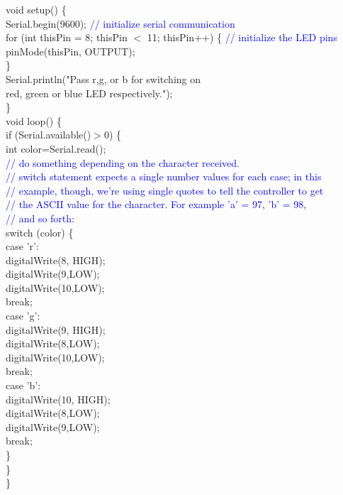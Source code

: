 \documentclass[12pt,a4paper]{article}
\begin{document}
void setup() \{\\
 Serial.begin(9600); \textcolor{blue}{ // initialize serial communication}\\
 for (int thisPin = 8; thisPin $<$ 11; thisPin++) \{    \textcolor{blue}{ // initialize the LED pins}\\
 pinMode(thisPin, OUTPUT);\\
 \}\\
 Serial.println("Pass r,g, or b for switching on \\red, green or blue LED          respectively.");\\
 \}\\[9pt]
void loop() \{\\
  if (Serial.available()$ > $0) \{\\
    int color=Serial.read();\\
     \textcolor{blue}{
    // do something depending on the character received.\\
    // switch statement expects a single number values for each case; in this\\
    // example, though, we're using single quotes to tell the controller to get\\
    // the ASCII value for the character. For example 'a' = 97, 'b' = 98,\\
    // and so forth:}\\
    switch (color) \{\\
      case 'r':\\
       digitalWrite(8, HIGH);\\
       digitalWrite(9,LOW);\\
       digitalWrite(10,LOW);\\
        break;\\
      case 'g':\\
        digitalWrite(9, HIGH);\\
        digitalWrite(8,LOW);\\
        digitalWrite(10,LOW);\\
        break;\\
       case 'b':\\
        digitalWrite(10, HIGH);\\
        digitalWrite(8,LOW);\\
        digitalWrite(9,LOW);\\
        break;\\
    \}\\
  \}\\
\}\\
\end{document}
